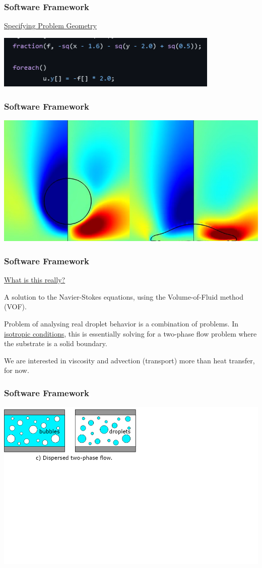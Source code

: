\documentclass[12pt]{beamer}
\begin{document}
\begin{frame}
    \frametitle{Software Framework}
    \underline{Specifying Problem Geometry}

    \includegraphics[width=0.8\textwidth]{img/geometry.png}
\end{frame}
\begin{frame}
    \frametitle{Software Framework}

    \includegraphics[width=\textwidth]{img/4-drop.png}
\end{frame}
\begin{frame}
    \frametitle{Software Framework}
    \underline{What is this really?}

    A solution to the Navier-Stokes equations,
    using the Volume-of-Fluid method (VOF).

    Problem of analysing real droplet behavior is a combination of problems. In 
    \underline{isotropic conditions}, this is essentially solving for a 
    two-phase flow problem where the substrate is a solid boundary.

    We are interested in viscosity and advection (transport) more than 
    heat transfer, for now.
\end{frame}
\begin{frame}
    \frametitle{Software Framework}

    \includegraphics[width=1.75\textwidth]{img/6-twophase.png}
\end{frame}
\end{document}
